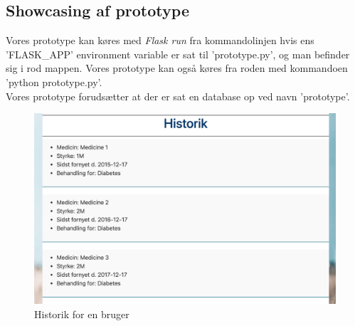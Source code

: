 \newpage
\subsection{Showcasing af prototype}
Vores prototype kan køres med \textit{Flask run} fra kommandolinjen hvis ens 'FLASK\_APP' environment variable er sat til 'prototype.py', og man befinder sig i rod mappen. Vores prototype kan også køres fra roden med kommandoen 'python prototype.py'.\\
Vores prototype forudsætter at der er sat en database op ved navn 'prototype'.

\begin{figure}[h!]
	\includegraphics[width=\linewidth]{Materials/Prototype/Historik}
	\caption{Historik for en bruger}
\end{figure}

